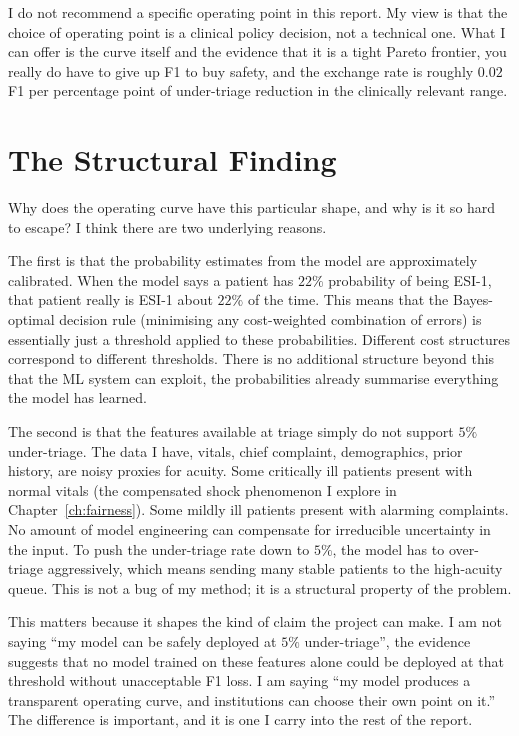 I do not recommend a specific operating point in this report. My view is that the choice of operating point is a clinical policy decision, not a technical one. What I can offer is the curve itself and the evidence that it is a tight Pareto frontier, you really do have to give up F1 to buy safety, and the exchange rate is roughly $0.02$ F1 per percentage point of under-triage reduction in the clinically relevant range.

\section{The Structural Finding}

Why does the operating curve have this particular shape, and why is it so hard to escape? I think there are two underlying reasons.

The first is that the probability estimates from the model are approximately calibrated. When the model says a patient has $22\%$ probability of being ESI-1, that patient really is ESI-1 about $22\%$ of the time. This means that the Bayes-optimal decision rule (minimising any cost-weighted combination of errors) is essentially just a threshold applied to these probabilities. Different cost structures correspond to different thresholds. There is no additional structure beyond this that the ML system can exploit, the probabilities already summarise everything the model has learned.

The second is that the features available at triage simply do not support $5\%$ under-triage. The data I have, vitals, chief complaint, demographics, prior history, are noisy proxies for acuity. Some critically ill patients present with normal vitals (the compensated shock phenomenon I explore in Chapter~\ref{ch:fairness}). Some mildly ill patients present with alarming complaints. No amount of model engineering can compensate for irreducible uncertainty in the input. To push the under-triage rate down to $5\%$, the model has to over-triage aggressively, which means sending many stable patients to the high-acuity queue. This is not a bug of my method; it is a structural property of the problem.

This matters because it shapes the kind of claim the project can make. I am not saying ``my model can be safely deployed at $5\%$ under-triage'', the evidence suggests that no model trained on these features alone could be deployed at that threshold without unacceptable F1 loss. I am saying ``my model produces a transparent operating curve, and institutions can choose their own point on it.'' The difference is important, and it is one I carry into the rest of the report.

